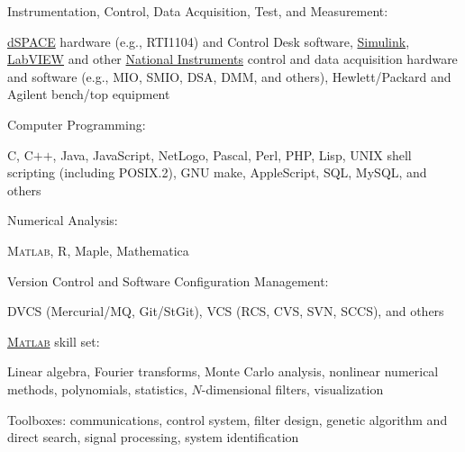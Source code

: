 \documentclass[10pt]{article}
\newcommand{\halfblankline}{\quad\vspace{-0.5\baselineskip}\pagebreak[3]}
\providecommand\Matlab{\textsc{Matlab}}
\begin{document}
\halfblankline

Instrumentation, Control, Data Acquisition, Test, and Measurement:
%
\begin{innerlist}
    \item \href{http://www.dspaceinc.com/}{dSPACE} hardware (e.g.,
        RTI1104) and Control Desk software,
        \href{http://www.mathworks.com/products/simulink/}{Simulink},
        \href{http://www.ni.com/}{LabVIEW} and other
        \href{http://www.ni.com}{National Instruments}
        control and data acquisition hardware and software (e.g., MIO,
        SMIO, DSA, DMM, and others), Hewlett\-/Packard and Agilent
        bench\-/top equipment
\end{innerlist}

\halfblankline

Computer Programming:
%
\begin{innerlist}
    \item C, C$+$$+$, Java, JavaScript, NetLogo, Pascal, Perl, PHP,
        Lisp, UNIX shell scripting (including POSIX.2), GNU make,
        AppleScript, SQL, MySQL, and others
\end{innerlist}

\halfblankline

Numerical Analysis:
%
\begin{innerlist}
    \item \Matlab, R, Maple, Mathematica
\end{innerlist}

\halfblankline

Version Control and Software Configuration Management:
%
\begin{innerlist}
    \item DVCS (Mercurial/MQ, Git/StGit), VCS (RCS, CVS, SVN, SCCS), and
        others
\end{innerlist}

\halfblankline

\href{http://www.mathworks.com/products/matlab/}{\Matlab} skill set:
%
\begin{innerlist}
    \item Linear algebra, Fourier transforms, Monte Carlo analysis,
        nonlinear numerical methods, polynomials, statistics,
        $N$-dimensional filters, visualization

    \item Toolboxes: communications, control system, filter design,
        genetic algorithm and direct search, signal processing, system
        identification
\end{innerlist}
\end{document}
